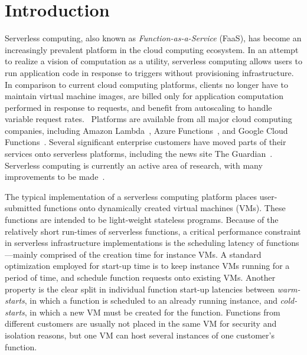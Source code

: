 \section{Introduction} \label{sec:intro}

 Serverless computing, also known as
\emph{Function-as-a-Service} (FaaS), has become an increasingly prevalent
platform in the cloud computing ecosystem. In an attempt to realize a vision of
computation as a utility, serverless computing allows users to run application
code in response to triggers without provisioning infrastructure. In comparison
to current cloud computing platforms, clients no longer have to maintain virtual
machine images, are billed only for application computation performed in
response to requests, and benefit from autoscaling to handle variable request
rates.~\cite{berkely-serverless} Platforms are available from all major cloud
computing companies, including Amazon Lambda~\cite{lambda}, Azure
Functions~\cite{azure-cf}, and Google Cloud Functions~\cite{gcf}. Several
significant enterprise customers have moved parts of their services onto
serverless platforms, including the news site The Guardian~\cite{guardian}.
Serverless computing is currently an active area of research, with many
improvements to be made~\cite{peeking}\cite{trilemma}\cite{steps-back}.

 The typical implementation of a
serverless computing platform places user-submitted functions onto dynamically
created virtual machines (VMs). These functions are intended to be light-weight
stateless programs. Because of the relatively short run-times of serverless
functions, a critical performance constraint in serverless infrastructure
implementations is the scheduling latency of functions---mainly comprised of
the creation time for instance VMs. A standard optimization employed for
start-up time is to keep instance VMs running for a period of time, and
schedule function requests onto existing VMs. Another property is the clear
split in individual function start-up latencies between \emph{warm-starts}, in
which a function is scheduled to an already running instance, and
\emph{cold-starts}, in which a new VM must be created for the function.
Functions from different customers are usually not placed in the same VM for
security and isolation reasons, but one VM can host several instances of one
customer's function.

